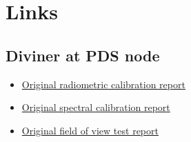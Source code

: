 \section{Links}

\subsection{Diviner at PDS node}

\begin{itemize}
\item \href{http://pds-geosciences.wustl.edu/lro/lro-l-dlre-4-rdr-v1/lrodlr_1001/calib/radiometric/dlre_radiometric_cal_report.pdf}{Original radiometric calibration report}
\item \href{http://pds-geosciences.wustl.edu/lro/lro-l-dlre-4-rdr-v1/lrodlr_1001/calib/spectral/dlre_spectral_test_report_r1.pdf}{Original spectral calibration report}
\item \href{http://pds-geosciences.wustl.edu/lro/lro-l-dlre-4-rdr-v1/lrodlr_1001/calib/fov/dlre_fov_test_report_rev_a.pdf}{Original field of view test report}
\end{itemize}